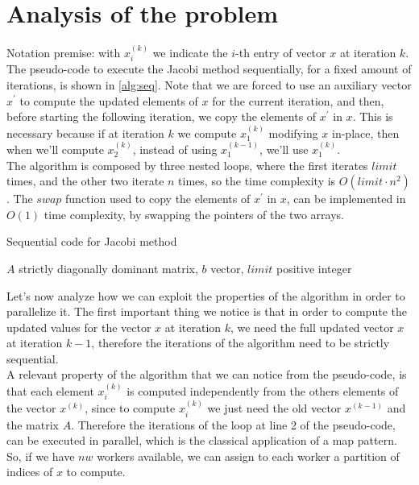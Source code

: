 \documentclass[12pt]{article}
\begin{document}
	\section{Analysis of the problem}
	Notation premise: with $x_i^{(k)}$ we indicate the $i$-th entry of vector $x$ at iteration $k$. The pseudo-code to execute the Jacobi method sequentially, for a fixed amount of iterations, is shown in \ref{alg:seq}. Note that we are forced to use an auxiliary vector $x^\prime$ to compute the updated elements of $x$ for the current iteration, and then, before starting the following iteration, we copy the elements of $x^\prime$ in $x$. This is necessary because if at iteration $k$ we compute $x^{(k)}_1$ modifying $x$ in-place, then when we'll compute $x^{(k)}_2$, instead of using $x^{(k-1)}_1$, we'll use $x^{(k)}_1$.\\
	The algorithm is composed by three nested loops, where the first iterates $limit$ times, and the other two iterate $n$ times, so the time complexity is $O(limit\cdot n^2)$. The $swap$ function used to copy the elements of $x^\prime$ in $x$, can be implemented in $O(1)$ time complexity, by swapping the pointers of the two arrays.
	\begin{algorithm}[H]
		\caption{Sequential code for Jacobi method}\label{alg:seq}
		\begin{algorithmic}[1]
			\Require $A$ strictly diagonally dominant matrix, $b$ vector, $limit$ positive integer
			\EndIf
			\EndFor
			\EndFor
			\EndFor
		\end{algorithmic}
	\end{algorithm}
	\noindent Let's now analyze how we can exploit the properties of the algorithm in order to parallelize it. The first important thing we notice is that in order to compute the updated values for the vector $x$ at iteration $k$, we need the full updated vector $x$ at iteration $k-1$, therefore the iterations of the algorithm need to be strictly sequential.\\
	A relevant property of the algorithm that we can notice from the pseudo-code, is that each element $x_i^{(k)}$ is computed independently from the others elements of the vector $x^{(k)}$, since to compute $x_i^{(k)}$ we just need the old vector $x^{(k-1)}$ and the matrix $A$. Therefore the iterations of the loop at line 2 of the pseudo-code, can be executed in parallel, which is the classical application of a map pattern. So, if we have $nw$ workers available, we can assign to each worker a partition of indices of $x$ to compute.\\
\end{document}

